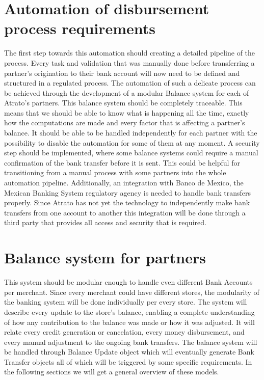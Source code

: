 \section{Automation of disbursement process requirements}
The first step towards this automation should creating a detailed pipeline of the process. Every task and validation that was manually done before transferring a partner’s origination to their bank account will now need to be defined and structured in a regulated process.
The automation of such a delicate process can be achieved through the development of a modular Balance system for each of Atrato’s partners. This balance system should be completely traceable. This means that we should be able to know what is happening all the time, exactly how the computations are made and every factor that is affecting a partner’s balance. It should be able to be handled independently for each partner with the possibility to disable the automation for some of them at any moment. A security step should be implemented, where some balance systems could require a manual confirmation of the bank transfer before it is sent. This could be helpful for transitioning from a manual process with some partners into the whole automation pipeline. 
Additionally, an integration with Banco de Mexico, the Mexican Banking System regulatory agency is needed to handle bank transfers properly. Since Atrato has not yet the technology to independently make bank transfers from one account to another this integration will be done through a third party that provides all access and security that is required.

\section{Balance system for partners}
This system should be modular enough to handle even different Bank Accounts per merchant. Since every merchant could have different stores, the modularity of the banking system will be done individually per every store. 
The system will describe every update to the store’s balance, enabling a complete understanding of how any contribution to the balance was made or how it was adjusted. It will relate every credit generation or cancelation, every money disbursement, and every manual adjustment to the ongoing bank transfers. 
The balance system will be handled through Balance Update object which will eventually generate Bank Transfer objects all of which will be triggered by some specific requirements. In the following sections we will get a general overview of these models. 
